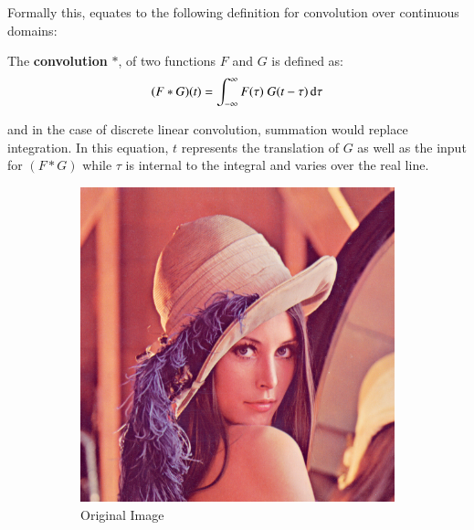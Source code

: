 Formally this, equates to the following definition for convolution over continuous domains:
\begin{definition}
	The \textbf{convolution} $*$, of two functions $F$ and $G$ is defined as:
	\begin{equation}
		(F*G)(t) = \int_{-\infty}^\infty F(\tau) \;G(t - \tau) \mathop{}\!\mathrm{d} \tau
	\end{equation}
\end{definition}
and in the case of discrete linear convolution, summation would replace integration.
In this equation, $t$ represents the translation of $G$ as well as the input for $(F*G)$
while $\tau$ is internal to the integral and varies over the real line.


\begin{figure}[ht] 
	\centering 
	\begin{subfigure}[b]{0.3\textwidth}
                \includegraphics[scale=0.25]{diagrams/Lenna}
                \caption{Original Image}
       \end{subfigure}
       \begin{subfigure}[b]{0.3\textwidth}

\end{subfigure}
\end{figure}

